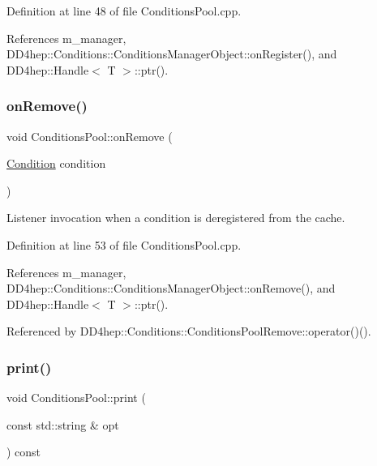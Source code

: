 Definition at line 48 of file Conditions\+Pool.\+cpp.



References m\+\_\+manager, D\+D4hep\+::\+Conditions\+::\+Conditions\+Manager\+Object\+::on\+Register(), and D\+D4hep\+::\+Handle$<$ T $>$\+::ptr().

\hypertarget{class_d_d4hep_1_1_conditions_1_1_conditions_pool_aadcb09f91ee89996577258c1d9443c88}{}\label{class_d_d4hep_1_1_conditions_1_1_conditions_pool_aadcb09f91ee89996577258c1d9443c88} 
\subsubsection{\texorpdfstring{on\+Remove()}{onRemove()}}
{\footnotesize\ttfamily void Conditions\+Pool\+::on\+Remove (\begin{DoxyParamCaption}\item[{\hyperlink{class_d_d4hep_1_1_conditions_1_1_condition}{Condition}}]{condition }\end{DoxyParamCaption})\hspace{0.3cm}{\ttfamily [protected]}}



Listener invocation when a condition is deregistered from the cache. 



Definition at line 53 of file Conditions\+Pool.\+cpp.



References m\+\_\+manager, D\+D4hep\+::\+Conditions\+::\+Conditions\+Manager\+Object\+::on\+Remove(), and D\+D4hep\+::\+Handle$<$ T $>$\+::ptr().



Referenced by D\+D4hep\+::\+Conditions\+::\+Conditions\+Pool\+Remove\+::operator()().

\hypertarget{class_d_d4hep_1_1_conditions_1_1_conditions_pool_ab84fe8f33366979c379fe2a625bd9a98}{}\label{class_d_d4hep_1_1_conditions_1_1_conditions_pool_ab84fe8f33366979c379fe2a625bd9a98} 
\subsubsection{\texorpdfstring{print()}{print()}}
{\footnotesize\ttfamily void Conditions\+Pool\+::print (\begin{DoxyParamCaption}\item[{const std\+::string \&}]{opt }\end{DoxyParamCaption}) const}



